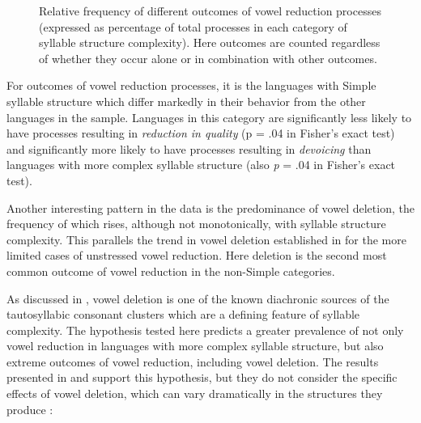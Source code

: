   
\begin{figure}
\caption{\label{fig:6.4} Relative frequency of different outcomes of vowel reduction processes (expressed as percentage of total processes in each category of syllable structure complexity). Here outcomes are counted regardless of whether they occur alone or in combination with other outcomes.}
\end{figure}

  For outcomes of vowel reduction processes, it is the languages with Simple syllable structure which differ markedly in their behavior from the other languages in the sample. Languages in this category are significantly less likely to have processes resulting in \textit{reduction in quality} (p = .04 in Fisher’s exact test) and significantly more likely to have processes resulting in \textit{devoicing} than languages with more complex syllable structure (also \textit{p} = .04 in Fisher’s exact test).

  Another interesting pattern in the data is the predominance of vowel deletion, the frequency of which rises, although not monotonically, with syllable structure complexity. This parallels the trend in vowel deletion established in  for the more limited cases of unstressed vowel reduction. Here deletion is the second most common outcome of vowel reduction in the non-Simple categories. 

  As discussed in , vowel deletion is one of the known diachronic sources of the tautosyllabic consonant clusters which are a defining feature of syllable complexity. The hypothesis tested here predicts a greater prevalence of not only vowel reduction in languages with more complex syllable structure, but also extreme outcomes of vowel reduction, including vowel deletion. The results presented in  and  support this hypothesis, but they do not consider the specific effects of vowel deletion, which can vary dramatically in the structures they produce :

